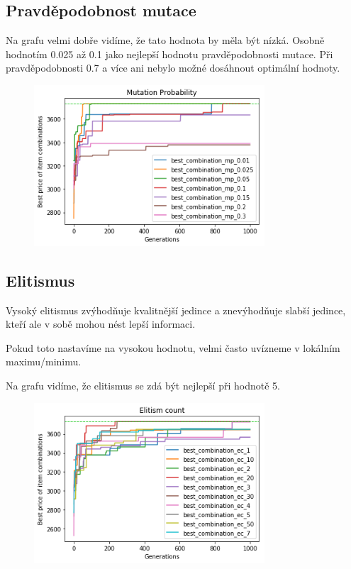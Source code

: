 \documentclass[a4paper,10pt,twocolumn]{article}
\begin{document}
\begin{itemize}
\begin{itemize}
\subsection{Pravděpodobnost mutace}


Na grafu velmi dobře vidíme, že tato hodnota by měla být nízká.
Osobně hodnotím 0.025 až 0.1 jako nejlepší hodnotu pravděpodobnosti mutace. Při pravděpodobnosti 0.7 a více ani nebylo možné dosáhnout optimální hodnoty.

\begin{figure}[H]
  \begin{center}
    \includegraphics[height=6cm]{graphs/mutation_probability.png}
  \end{center}
\end{figure}


\subsection{Elitismus}

Vysoký elitismus zvýhodňuje kvalitnější jedince a znevýhodňuje slabší jedince, kteří ale v sobě mohou nést lepší informaci.

Pokud toto nastavíme na vysokou hodnotu, velmi často uvízneme v lokálním maximu/minimu.

Na grafu vidíme, že elitismus se zdá být nejlepší při hodnotě 5.


\begin{figure}[H]
  \begin{center}
    \includegraphics[height=6cm]{graphs/elitism_count.png}
  \end{center}
\end{figure}



\end{itemize}
\end{itemize}
\end{document}
